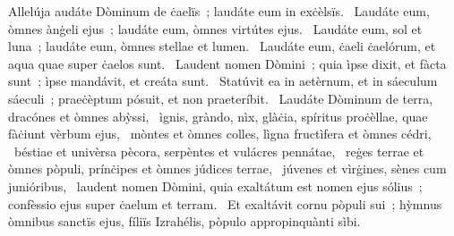 { Allelúja}
{%
audáte Dòminum de ċaelïs~; laudáte eum in exċèlsïs. 
~Laudáte eum, òmnes ànġeli ejus~; laudáte eum, òmnes virtútes ejus. 
~Laudáte eum, sol et luna~; laudáte eum, òmnes stellae et lumen. 
~Laudáte eum, ċaeli ċaelórum, et aqua quae super ċaelos sunt. 
~Laudent nomen Dòmini~; quia ìpse dixit, et fàcta sunt~; ìpse mandávit, et creáta sunt. 
~Statúvit ea in aetèrnum, et in sáeculum sáeculi~; praeċèptum pósuit, et non praeteríbit. 
~Laudáte Dòminum de terra, dracónes et òmnes abỳssi, 
~ìgnis, gràndo, nìx, glàċia, spíritus proċèllae, quae fàċiunt vèrbum ejus, 
~mòntes et òmnes colles, lìgna fructìfera et òmnes cédri, 
~béstiae et univèrsa pècora, serpèntes et vulácres pennátae, 
~reġes terrae et òmnes pòpuli, prínċipes et òmnes júdices terrae, 
~júvenes et vìrġines, sènes cum junióribus, 
~laudent nomen Dòmini, quia exaltátum est nomen ejus sólius~; confèssio ejus super ċaelum et terram. 
~Et exaltávit cornu pòpuli sui~; hỳmnus òmnibus sanctïs ejus, fíliïs Izrahélis, pòpulo appropinquànti sìbi. 
}
